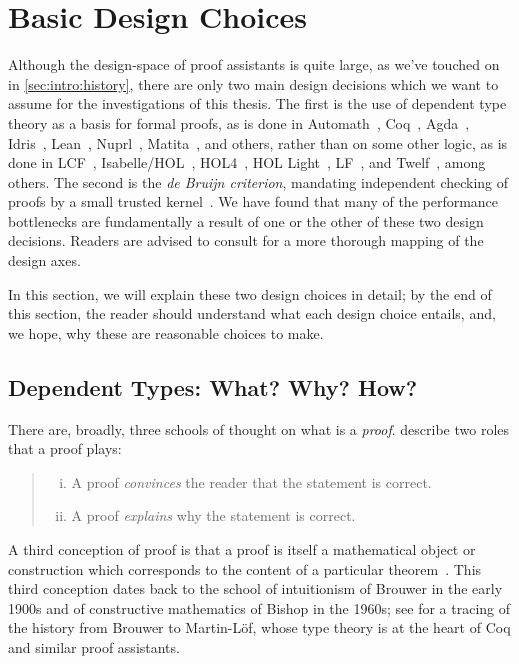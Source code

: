 \section{Basic Design Choices}\label{sec:intro:proof-assistant-design-choices}
Although the design-space of proof assistants is quite large, as we've touched on in \autoref{sec:intro:history}, there are only two main design decisions which we want to assume for the investigations of this thesis.
The first is the use of dependent type theory as a basis for formal proofs, as is done in Automath~\cite{wiki:AutoMath,mathematical1970Bruijn,Survey1994deBruijn}, Coq~\cite{coq}, Agda~\cite{Dependently2009Norell}, Idris~\cite{Idris2013Brady}, Lean~\cite{Lean2015Moura}, Nuprl~\cite{nuprl}, Matita~\cite{Matita2011Asperti}, and others, rather than on some other logic, as is done in LCF~\cite{LCF2000Gordon,gordon1979edinburgh,gordon1978metalanguage}, Isabelle/HOL~\cite{LCF2019Paulson,Isabelle/Isar2002Wenzel,Isabelle,paulson1994isabelle}, HOL4~\cite{slind2008brief}, HOL Light~\cite{harrison1996hol}, LF~\cite{pfenning1991logic,harper93}, and Twelf~\cite{pfenning1999system}, among others.
The second is the \emph{de Bruijn criterion}, mandating independent checking of proofs by a small trusted kernel~\cite{challenge2005Barendregt}.
We have found that many of the performance bottlenecks are fundamentally a result of one or the other of these two design decisions.
Readers are advised to consult \textcite[ch.~4]{ringer2020qed} for a more thorough mapping of the design axes.

In this section, we will explain these two design choices in detail;
by the end of this section, the reader should understand what each design choice entails, and, we hope, why these are reasonable choices to make.


\subsection{Dependent Types: What? Why? How?}\label{sec:why-how-dependent-types}
There are, broadly, three schools of thought on what is a \emph{proof}.
\textcite{Proof2009Geuvers} describe two roles that a proof plays:
\begin{quote}
\begin{enumerate}[(i)]
\item A proof \emph{convinces} the reader that the statement is correct.
\item A proof \emph{explains} why the statement is correct.
\end{enumerate}
\end{quote}
A third conception of proof is that a proof is itself a mathematical object or construction which corresponds to the content of a particular theorem~\cite{Rigour2013Bauer}.
This third conception dates back to the school of intuitionism of Brouwer in the early 1900s and of constructive mathematics of Bishop in the 1960s; see \textcite[Related Works]{nuprl} for a tracing of the history from Brouwer to Martin-L\"of, whose type theory is at the heart of Coq and similar proof assistants.

